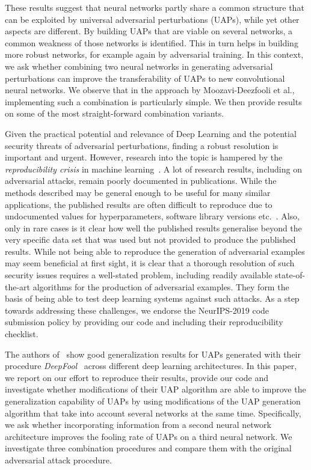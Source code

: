 \documentclass[runningheads]{llncs}
\begin{document}
These results suggest that neural networks partly share a common structure that can be exploited by universal adversarial perturbations (UAPs), while yet other aspects are different. By building UAPs that are viable on several networks, a common weakness of those networks is identified. This in turn helps in building more robust networks, for example again by adversarial training. In this context, we ask whether combining two neural networks in generating adversarial perturbations can improve the transferability of UAPs to new convolutional neural networks. We observe that in the approach by Moozavi-Deezfooli et al., implementing such a combination is particularly simple. We then provide results on some of the most straight-forward combination variants.

Given the practical potential and relevance of Deep Learning and the potential security threats of adversarial perturbations, finding a robust resolution is important and urgent. However, research into the topic is hampered by the \emph{reproducibility crisis} in machine learning~\cite{raff2020quantifying}. A lot of research results, including on adversarial attacks, remain poorly documented in publications. While the methods described may be general enough to be useful for many similar applications, the published results are often difficult to reproduce due to undocumented values for hyperparameters, software library versions etc.~\cite{Gundersen2018StateOT}. %
Also, only in rare cases is it clear how well the published results generalise beyond the very specific data set that was used but not provided to produce the published results. While not being able to reproduce the generation of adversarial examples may seem beneficial at first sight, it is clear that a thorough resolution of such security issues requires a well-stated problem, including readily available state-of-the-art algorithms for the production of adversarial examples. They form the basis of being able to test deep learning systems against such attacks. 
As a step towards addressing these challenges, we endorse the NeurIPS-2019 code submission policy by providing our code and including their reproducibility checklist.

The authors of~\cite{moosavidezfooli_universal_2017,moosavi-dezfooli_deepfool_2016} show good generalization results for UAPs generated with their procedure \emph{DeepFool}~\cite{moosavi-dezfooli_deepfool_2016} across different deep learning architectures. 
In this paper, we report on our effort to reproduce their results, provide our code and investigate whether modifications of their UAP algorithm are able to improve the generalization capability of UAPs by using modifications of the UAP generation algorithm that take into account several networks at the same time. Specifically, we ask whether incorporating information from a second neural network architecture improves the fooling rate of UAPs on a third neural network. We investigate three combination procedures and compare them with the original adversarial attack procedure.
\end{document}
